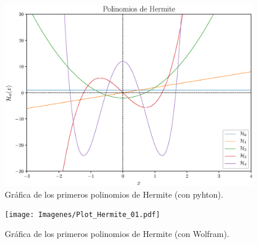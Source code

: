 \documentclass[12pt]{beamer}
\begin{document}
\begin{frame}[plain]
\begin{figure}[H]
    \centering
    \includegraphics[scale=0.5]{Imagenes/Polinomios_Hermite_01.eps}
    \caption{Gráfica de los primeros polinomios de Hermite (con pyhton).}
    \label{figura_003}
\end{figure}
\end{frame}
\begin{frame}[plain]
\begin{figure}[H]
    \centering
    \texttt{[image: Imagenes/Plot\_Hermite\_01.pdf]}
    \caption{Gráfica de los primeros polinomios de Hermite (con Wolfram).}
    \label{figura_004}
\end{figure}
\end{frame}
\end{document}
